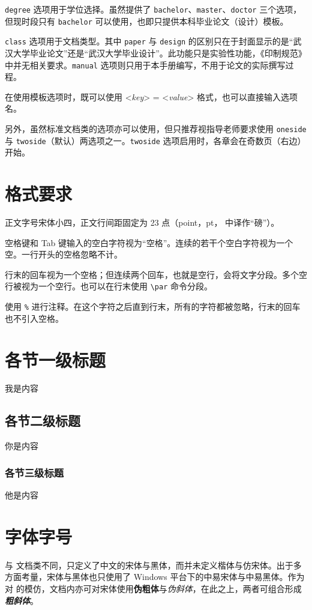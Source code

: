 \verb|degree| 选项用于学位选择。虽然提供了 \verb|bachelor|、\verb|master|、\verb|doctor| 三个选项，但现时段只有 \verb|bachelor| 可以使用，也即只提供本科毕业论文（设计）模板。

\verb|class| 选项用于文档类型。其中 \verb|paper| 与 \verb|design| 的区别只在于封面显示的是“武汉大学毕业论文”还是“武汉大学毕业设计”。此功能只是实验性功能，《印制规范》中并无相关要求。\verb|manual| 选项则只用于本手册编写，不用于论文的实际撰写过程。

在使用模板选项时，既可以使用 <\textit{key}> = <\textit{value}> 格式，也可以直接输入选项名。

另外，虽然标准文档类的选项亦可以使用，但只推荐视指导老师要求使用 \verb|oneside| 与 \verb|twoside|（默认）两选项之一。\verb|twoside| 选项启用时，各章会在奇数页（右边）开始。

\section{格式要求}
正文字号宋体小四，正文行间距固定为 23 点（point，pt， 中译作“磅”）。

空格键和 Tab       键输入的空白字符视为“空格”。连续的若干个空白字符视为一个空。一行开头的空格忽略不计。\par
行末的回车视为一个空格；但连续两个回车，也就是空行，会将文字分段。多个空行被视为一个空行。也可以在行末使用 \verb|\par| 命令分段。



使用 \verb|%| 进行注释。在这个字符之后直到行末，所有的字符都被忽略，行末的回车也不引入空格。%

\section{各节一级标题}
我是内容

\subsection{各节二级标题}
你是内容

\subsubsection{各节三级标题}
他是内容

\section{字体字号}
与 \CTeX 文档类不同，\WhuThesis 只定义了中文的宋体与{\heiti 黑体}，而并未定义楷体与仿宋体。出于多方面考量，宋体与黑体也只使用了 Windows 平台下的中易宋体与中易黑体。作为对  的模仿，文档内亦可对宋体使用\textbf{伪粗体}与\textit{伪斜体}，在此之上，两者可组合形成\textbf{\textit{粗斜体}}。

